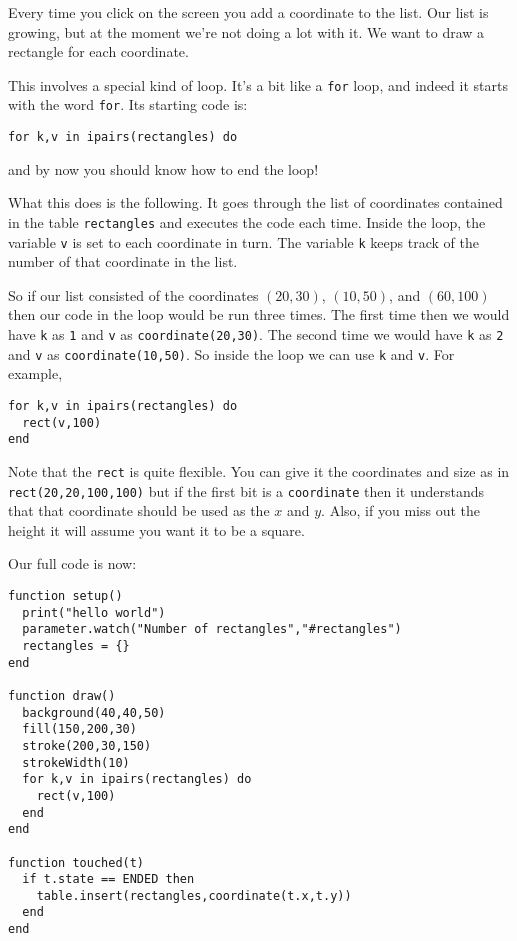 \documentclass[
  xhtml,%
  use filename%
]{internet}
\begin{document}
Every time you click on the screen you add a coordinate to the list.
Our list is growing, but at the moment we're not doing a lot with it.
We want to draw a rectangle for each coordinate.

This involves a special kind of loop.
It's a bit like a \verb+for+ loop, and indeed it starts with the word \verb+for+.
Its starting code is:

\begin{verbatim}
for k,v in ipairs(rectangles) do
\end{verbatim}

\noindent and by now you should know how to end the loop!

What this does is the following.
It goes through the list of coordinates contained in the table \verb+rectangles+ and executes the code each time.
Inside the loop, the variable \verb+v+ is set to each coordinate in turn.
The variable \verb+k+ keeps track of the number of that coordinate in the list.

So if our list consisted of the coordinates \((20,30)\), \((10,50)\), and \((60,100)\) then our code in the loop would be run three times.
The first time then we would have \verb+k+ as \verb+1+ and \verb+v+ as \verb+coordinate(20,30)+.
The second time we would have \verb+k+ as \verb+2+ and \verb+v+ as \verb+coordinate(10,50)+.
So inside the loop we can use \verb+k+ and \verb+v+.
For example,

\begin{verbatim}
for k,v in ipairs(rectangles) do
  rect(v,100)
end
\end{verbatim}

Note that the \verb+rect+ is quite flexible.
You can give it the coordinates and size as in \verb+rect(20,20,100,100)+ but if the first bit is a \verb+coordinate+ then it understands that that coordinate should be used as the \(x\) and \(y\).
Also, if you miss out the height it will assume you want it to be a square. 

Our full code is now:

\begin{verbatim}
function setup()
  print("hello world")
  parameter.watch("Number of rectangles","#rectangles")
  rectangles = {}
end

function draw()
  background(40,40,50)
  fill(150,200,30)
  stroke(200,30,150)
  strokeWidth(10)
  for k,v in ipairs(rectangles) do
    rect(v,100)
  end
end

function touched(t)
  if t.state == ENDED then
    table.insert(rectangles,coordinate(t.x,t.y))
  end
end
\end{verbatim}
\end{document}
